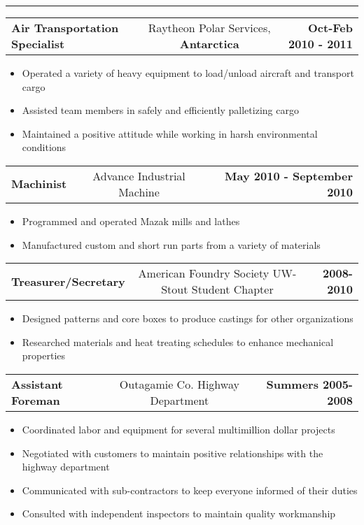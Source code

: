 \documentclass[11pt,letterpaper]{article}
\makeatletter
\newcommand{\headerrow}[3]
{\vspace{0.4em}
\noindent
\begin{tabular*}{\textwidth}{l @{\extracolsep{\fill}} cr}
	\textbf{#1} & %
	#2 &		  %
	\textbf{#3}\\ %
\end{tabular*}}
\makeatother
\begin{document}
	\vspace{-0.5em}
	\hrule
	
	\headerrow
		{Air Transportation Specialist}
		{Raytheon Polar Services, \textbf{Antarctica}}
		{Oct-Feb 2010 - 2011}
	\begin{itemize}
		\item Operated a variety of heavy equipment to load/unload aircraft and transport cargo
		\item Assisted team members in safely and efficiently palletizing cargo
		\item Maintained a positive attitude while working in harsh environmental conditions
	\end{itemize}
	
	\headerrow
		{Machinist}
		{Advance Industrial Machine}
		{May 2010 - September 2010}
	\begin{itemize}
		\item Programmed and operated Mazak mills and lathes
		\item Manufactured custom and short run parts from a variety of materials
	\end{itemize}
	
	\headerrow
		{Treasurer/Secretary}
		{American Foundry Society UW-Stout Student Chapter}
		{2008-2010}
	\begin{itemize}
		\item Designed patterns and core boxes to produce castings for other organizations
		\item Researched materials and heat treating schedules to enhance mechanical properties
	\end{itemize}
	
	\headerrow
		{Assistant Foreman}
		{Outagamie Co. Highway Department}
		{Summers 2005-2008}
	\begin{itemize}
		\item Coordinated labor and equipment for several multimillion dollar projects
		\item Negotiated with customers to maintain positive relationships with the highway department
		\item Communicated with sub-contractors to keep everyone informed of their duties
		\item Consulted with independent inspectors to maintain quality workmanship
	\end{itemize}
	
\end{document}
